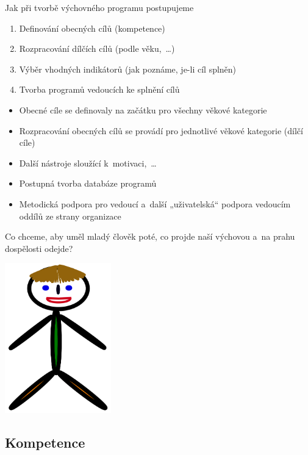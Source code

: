 \documentclass[compress, ucs, xelatex, xcolor=dvipsnames, print,
  hyperref={
    bookmarks=true,
    unicode=true,
    colorlinks=true,
    plainpages=false,
    pdfkeywords={Junak, Pedagogika, Skaut, Skauting, Vychovna metoda},
    linkcolor=Black,
    anchorcolor=Black,
    citecolor=OliveGreen,
    filecolor=OliveGreen,
    menucolor=Black,
    urlcolor=OliveGreen,
    pdftex}
  ]{beamer}
\begin{document}
\begin{frame}{Jak při tvorbě výchovného programu postupujeme}
  \begin{enumerate}
    \item Definování obecných cílů (kompetence)
    \item Rozpracování dílčích cílů (podle věku,~\ldots)
    \item Výběr vhodných indikátorů (jak poznáme, je-li cíl splněn)
    \item Tvorba programů vedoucích ke splnění cílů
  \end{enumerate}
  \begin{itemize}
    \item Obecné cíle se definovaly na začátku pro všechny věkové kategorie
    \item Rozpracování obecných cílů se provádí pro jednotlivé věkové kategorie (dílčí cíle)
    \item Další nástroje sloužící k~motivaci,~\ldots
    \item Postupná tvorba databáze programů
    \item Metodická podpora pro vedoucí a~další „uživatelská“ podpora vedoucím oddílů ze strany organizace
  \end{itemize}
\end{frame}

\begin{frame}{Co chceme, aby uměl mladý člověk poté, co projde naší výchovou a~na prahu dospělosti odejde?}
  \begin{center}
    \includegraphics[height=6.5cm]{pepicek.png}
  \end{center}
\end{frame}

\subsection{Kompetence}
\end{document}
